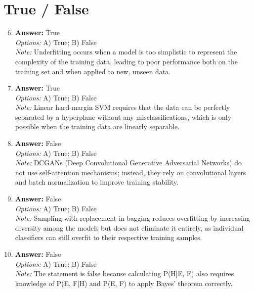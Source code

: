 \documentclass[12pt]{article}
\begin{document}
\section*{True / False}
\begin{enumerate}[label=\arabic*.]
\setcounter{enumi}{5}
\item \textbf{Answer:} True
\\ \textit{Options:} A) True; B) False
\\ \textit{Note:} Underfitting occurs when a model is too simplistic to represent the complexity of the training data, leading to poor performance both on the training set and when applied to new, unseen data.
\item \textbf{Answer:} True
\\ \textit{Options:} A) True; B) False
\\ \textit{Note:} Linear hard-margin SVM requires that the data can be perfectly separated by a hyperplane without any misclassifications, which is only possible when the training data are linearly separable.
\item \textbf{Answer:} False
\\ \textit{Options:} A) True; B) False
\\ \textit{Note:} DCGANs (Deep Convolutional Generative Adversarial Networks) do not use self-attention mechanisms; instead, they rely on convolutional layers and batch normalization to improve training stability.
\item \textbf{Answer:} False
\\ \textit{Options:} A) True; B) False
\\ \textit{Note:} Sampling with replacement in bagging reduces overfitting by increasing diversity among the models but does not eliminate it entirely, as individual classifiers can still overfit to their respective training samples.
\item \textbf{Answer:} False
\\ \textit{Options:} A) True; B) False
\\ \textit{Note:} The statement is false because calculating P(H|E, F) also requires knowledge of P(E, F|H) and P(E, F) to apply Bayes' theorem correctly.
\end{enumerate}
\end{document}
